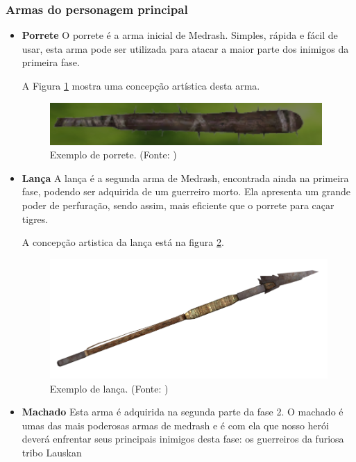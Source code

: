 \subsubsection{Armas do personagem principal}
\begin{itemize}
\item {\bf Porrete}
O porrete é a arma inicial de Medrash. Simples, rápida e fácil de usar,
 esta arma pode ser utilizada para atacar a maior parte dos inimigos da
 primeira fase.

A Figura \ref{img:porrete} mostra uma concepção artística desta arma.

\begin{figure}[H]
 \centering
 \includegraphics[scale=1]{Imagens/porrete01.png}
 \caption{Exemplo de porrete.  (Fonte: \cite{bib:jogoinfinity})}
\label{img:porrete}
\end{figure}

\item {\bf Lança}
A lança é a segunda arma de Medrash, encontrada ainda na primeira fase,
 podendo ser adquirida de um guerreiro morto. Ela apresenta um grande poder
 de perfuração, sendo assim, mais eficiente que o porrete para caçar
 tigres.

A concepção artistica da lança está na figura \ref{img:lanca}.

\begin{figure}[H]
 \centering
 \includegraphics[scale=0.6]{Imagens/lanca01.png}
 \caption{Exemplo de lança. (Fonte: \cite{bib:lanca01})}
\label{img:lanca}
\end{figure}


\item {\bf Machado}
Esta arma é adquirida na segunda parte da fase 2. O machado é umas das mais
 poderosas armas de 
medrash e é com ela que nosso herói deverá enfrentar seus principais
 inimigos desta fase: os guerreiros da furiosa tribo Lauskan


\end{itemize}
